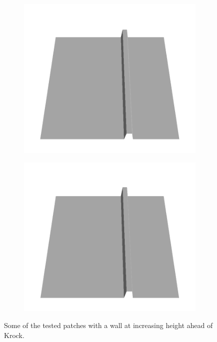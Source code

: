 \documentclass[../document.tex]{subfiles}
\begin{document}
\begin{figure}[H]
\begin{subfigure}[b]{0.24\textwidth}
    \end{subfigure}
    \begin{subfigure}[b]{0.24\textwidth}
    \includegraphics[width=\linewidth]{../img/5/custom_patches/walls_increasing/all/30-3d.png}
    \end{subfigure}
    \begin{subfigure}[b]{0.24\textwidth}
    \includegraphics[width=\linewidth]{../img/5/custom_patches/walls_increasing/all/35-3d.png}
    \end{subfigure}
    \caption{Some of the tested patches with a wall at increasing height ahead of Krock.}
    \end{figure}
\end{document}
